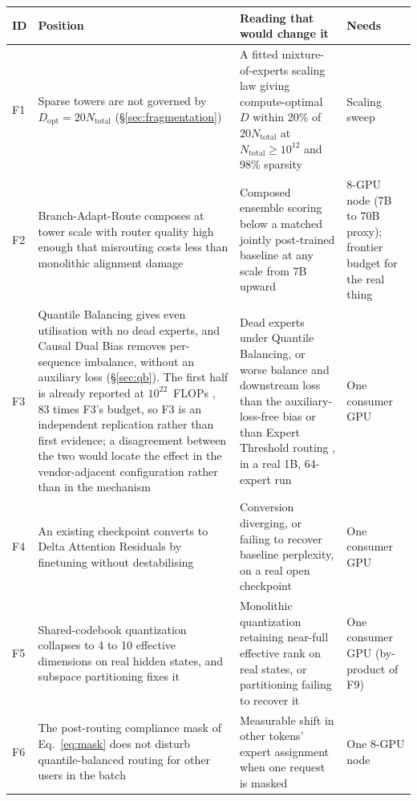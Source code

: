 \documentclass[11pt]{article}
\begin{document}
\begin{longtable}{@{}p{}p{}p{}p{}@{}}
\toprule
\textbf{ID} & \textbf{Position} & \textbf{Reading that would change it} & \textbf{Needs} \\
\midrule
\endhead
F1 & Sparse towers are not governed by $D_{\mathrm{opt}}=20N_{\mathrm{total}}$ (\S\ref{sec:fragmentation}) & A fitted mixture-of-experts scaling law giving compute-optimal $D$ within 20\% of $20N_{\mathrm{total}}$ at $N_{\mathrm{total}}\geq10^{12}$ and 98\% sparsity & Scaling sweep \\
\addlinespace
F2 & Branch-Adapt-Route composes at tower scale with router quality high enough that misrouting costs less than monolithic alignment damage & Composed ensemble scoring below a matched jointly post-trained baseline at any scale from 7B upward & 8-GPU node (7B to 70B proxy); frontier budget for the real thing \\
\addlinespace
F3 & Quantile Balancing gives even utilisation with no dead experts, and Causal Dual Bias removes per-sequence imbalance, without an auxiliary loss (\S\ref{sec:qb}). The first half is already reported at $10^{22}$~FLOPs \cite{openathena2026qb}, 83 times F3's budget, so F3 is an independent replication rather than first evidence; a disagreement between the two would locate the effect in the vendor-adjacent configuration rather than in the mechanism & Dead experts under Quantile Balancing, or worse balance and downstream loss than the auxiliary-loss-free bias or than Expert Threshold routing \cite{sun2026et}, in a real 1B, 64-expert run & One consumer GPU \\
\addlinespace
F4 & An existing checkpoint converts to Delta Attention Residuals by finetuning without destabilising & Conversion diverging, or failing to recover baseline perplexity, on a real open checkpoint & One consumer GPU \\
\addlinespace
F5 & Shared-codebook quantization collapses to 4 to 10 effective dimensions on real hidden states, and subspace partitioning fixes it & Monolithic quantization retaining near-full effective rank on real states, or partitioning failing to recover it & One consumer GPU (by-product of F9) \\
\addlinespace
F6 & The post-routing compliance mask of Eq.~\eqref{eq:mask} does not disturb quantile-balanced routing for other users in the batch & Measurable shift in other tokens' expert assignment when one request is masked & One 8-GPU node \\

\end{longtable}
\end{document}
